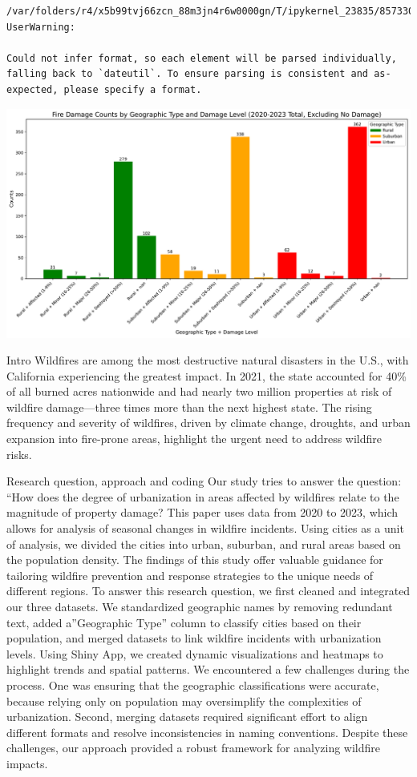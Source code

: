 \documentclass[
  letterpaper,
  DIV=11,
  numbers=noendperiod]{scrartcl}
\begin{document}
\begin{verbatim}
/var/folders/r4/x5b99tvj66zcn_88m3jn4r6w0000gn/T/ipykernel_23835/857330891.py:1: UserWarning:

Could not infer format, so each element will be parsed individually, falling back to `dateutil`. To ensure parsing is consistent and as-expected, please specify a format.
\end{verbatim}

\includegraphics{Final Writeup_files/figure-pdf/cell-19-output-1.pdf}

Intro Wildfires are among the most destructive natural disasters in the
U.S., with California experiencing the greatest impact. In 2021, the
state accounted for 40\% of all burned acres nationwide and had nearly
two million properties at risk of wildfire damage---three times more
than the next highest state. The rising frequency and severity of
wildfires, driven by climate change, droughts, and urban expansion into
fire-prone areas, highlight the urgent need to address wildfire risks.

Research question, approach and coding Our study tries to answer the
question: ``How does the degree of urbanization in areas affected by
wildfires relate to the magnitude of property damage? This paper uses
data from 2020 to 2023, which allows for analysis of seasonal changes in
wildfire incidents. Using cities as a unit of analysis, we divided the
cities into urban, suburban, and rural areas based on the population
density. The findings of this study offer valuable guidance for
tailoring wildfire prevention and response strategies to the unique
needs of different regions. To answer this research question, we first
cleaned and integrated our three datasets. We standardized geographic
names by removing redundant text, added a''Geographic Type'' column to
classify cities based on their population, and merged datasets to link
wildfire incidents with urbanization levels. Using Shiny App, we created
dynamic visualizations and heatmaps to highlight trends and spatial
patterns. We encountered a few challenges during the process. One was
ensuring that the geographic classifications were accurate, because
relying only on population may oversimplify the complexities of
urbanization. Second, merging datasets required significant effort to
align different formats and resolve inconsistencies in naming
conventions. Despite these challenges, our approach provided a robust
framework for analyzing wildfire impacts.
\end{document}

